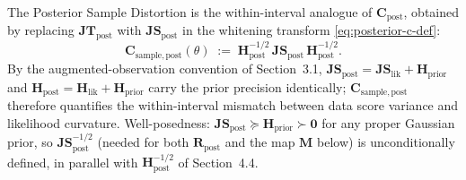 \documentclass[11pt]{article}
\begin{document}
The Posterior Sample Distortion is the within-interval analogue of $\mathbf C_{\mathrm{post}}$, obtained by replacing $\mathbf{JT}_{\mathrm{post}}$ with $\mathbf{JS}_{\mathrm{post}}$ in the whitening transform \eqref{eq:posterior-c-def}:
\begin{equation}
\mathbf C_{\mathrm{sample},\mathrm{post}}(\theta)
\;:=\;
\mathbf H_{\mathrm{post}}^{-1/2}\,
\mathbf{JS}_{\mathrm{post}}\,
\mathbf H_{\mathrm{post}}^{-1/2}.
\label{eq:posterior-c-sample-def}
\end{equation}
By the augmented-observation convention of Section~3.1, $\mathbf{JS}_{\mathrm{post}} = \mathbf{JS}_{\mathrm{lik}} + \mathbf H_{\mathrm{prior}}$ and $\mathbf H_{\mathrm{post}} = \mathbf H_{\mathrm{lik}} + \mathbf H_{\mathrm{prior}}$ carry the prior precision identically; $\mathbf C_{\mathrm{sample},\mathrm{post}}$ therefore quantifies the within-interval mismatch between data score variance and likelihood curvature. Well-posedness: $\mathbf{JS}_{\mathrm{post}} \succeq \mathbf H_{\mathrm{prior}} \succ \mathbf 0$ for any proper Gaussian prior, so $\mathbf{JS}_{\mathrm{post}}^{-1/2}$ (needed for both $\mathbf R_{\mathrm{post}}$ and the map $\mathbf M$ below) is unconditionally defined, in parallel with $\mathbf H_{\mathrm{post}}^{-1/2}$ of Section~4.4.
\end{document}
